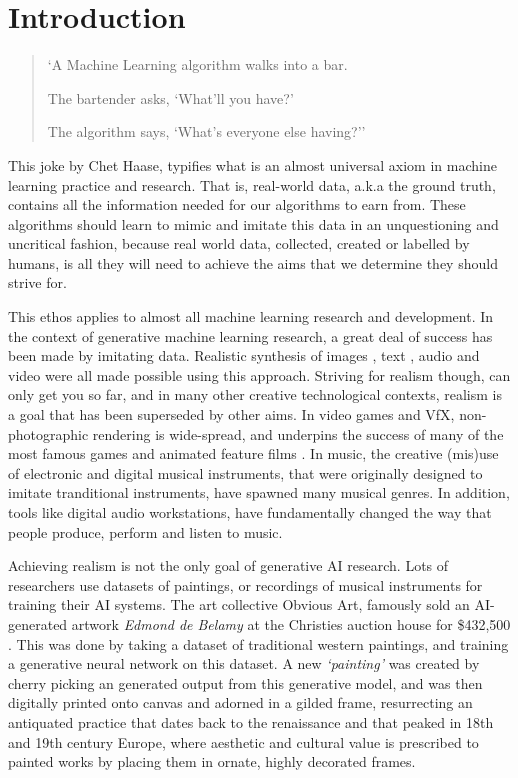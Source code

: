 \chapter{Introduction}
\label{ch:intro}

\begin{quote}

`A Machine Learning algorithm walks into a bar.

The bartender asks, `What'll you have?'

The algorithm says, `What's everyone else having?'' \citep{haase2017bar} \end{quote}

This joke by Chet Haase, typifies what is an almost universal axiom in machine learning practice and research. 
That is, real-world data, a.k.a the ground truth, contains all the information needed for our algorithms to earn from. 
These algorithms should learn to mimic and imitate this data in an unquestioning and uncritical fashion, because real world data, collected, created or labelled by humans, is all they will need to achieve the aims that we determine they should strive for.

This ethos applies to almost all machine learning research and development. In the context of generative machine learning research, a great deal of success has been made by imitating data. 
Realistic synthesis of images \citep{karras2019style}, text \citep{radford2018improving}, audio \citep{oord2016wavenet} and video \citep{openai2024sora} were all made possible using this approach. 
Striving for realism though, can only get you so far, and in many other creative technological contexts, realism is a goal that has been superseded by other aims. 
In video games and VfX, non-photographic rendering is wide-spread, and underpins the success of many of the most famous games and animated feature films . 
In music, the creative (mis)use of electronic and digital musical instruments, that were originally designed to imitate tranditional instruments, have spawned many musical genres. In addition, tools like digital audio workstations, have fundamentally changed the way that people produce, perform and listen to music.

Achieving realism is not the only goal of generative AI research. 
Lots of researchers use datasets of paintings, or recordings of musical instruments for training their AI systems. 
The art collective Obvious Art, famously sold an AI-generated artwork \textit{Edmond de Belamy} at the Christies auction house for \$432,500 \citep{christies2018edmond}.
This was done by taking a dataset of traditional western paintings, and training a generative neural network on this dataset. 
A new \textit{`painting’} was created by cherry picking an generated output from this generative model, and was then digitally printed onto canvas and adorned in a gilded frame, resurrecting an antiquated practice that dates back to the renaissance and that peaked in 18th and 19th century Europe, where aesthetic and cultural value is prescribed to painted works by placing them in ornate, highly decorated frames.

